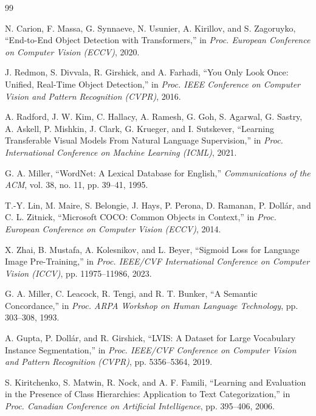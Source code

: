 \vspace{-1mm}
\begin{thebibliography}{99}

    N. Carion, F. Massa, G. Synnaeve, N. Usunier, A. Kirillov, and S. Zagoruyko,
    ``End-to-End Object Detection with Transformers,''
    in {\it Proc. European Conference on Computer Vision (ECCV)}, 2020.

    J. Redmon, S. Divvala, R. Girshick, and A. Farhadi,
    ``You Only Look Once: Unified, Real-Time Object Detection,''
    in {\it Proc. IEEE Conference on Computer Vision and Pattern Recognition (CVPR)}, 2016.

    A. Radford, J. W. Kim, C. Hallacy, A. Ramesh, G. Goh, S. Agarwal, G. Sastry, A. Askell, P. Mishkin, J. Clark, G. Krueger, and I. Sutskever,
    ``Learning Transferable Visual Models From Natural Language Supervision,''
    in {\it Proc. International Conference on Machine Learning (ICML)}, 2021.

    G. A. Miller,
    ``WordNet: A Lexical Database for English,''
    {\it Communications of the ACM}, vol. 38, no. 11, pp. 39--41, 1995.

    T.-Y. Lin, M. Maire, S. Belongie, J. Hays, P. Perona, D. Ramanan, P. Doll\'{a}r, and C. L. Zitnick,
    ``Microsoft COCO: Common Objects in Context,''
    in {\it Proc. European Conference on Computer Vision (ECCV)}, 2014.

    X. Zhai, B. Mustafa, A. Kolesnikov, and L. Beyer,
    ``Sigmoid Loss for Language Image Pre-Training,''
    in {\it Proc. IEEE/CVF International Conference on Computer Vision (ICCV)}, pp. 11975--11986, 2023.

    G. A. Miller, C. Leacock, R. Tengi, and R. T. Bunker,
    ``A Semantic Concordance,''
    in {\it Proc. ARPA Workshop on Human Language Technology}, pp. 303--308, 1993.

    A. Gupta, P. Doll\'{a}r, and R. Girshick,
    ``LVIS: A Dataset for Large Vocabulary Instance Segmentation,''
    in {\it Proc. IEEE/CVF Conference on Computer Vision and Pattern Recognition (CVPR)}, pp. 5356--5364, 2019.

    S. Kiritchenko, S. Matwin, R. Nock, and A. F. Famili,
    ``Learning and Evaluation in the Presence of Class Hierarchies: Application to Text Categorization,''
    in {\it Proc. Canadian Conference on Artificial Intelligence}, pp. 395--406, 2006.

\end{thebibliography}
